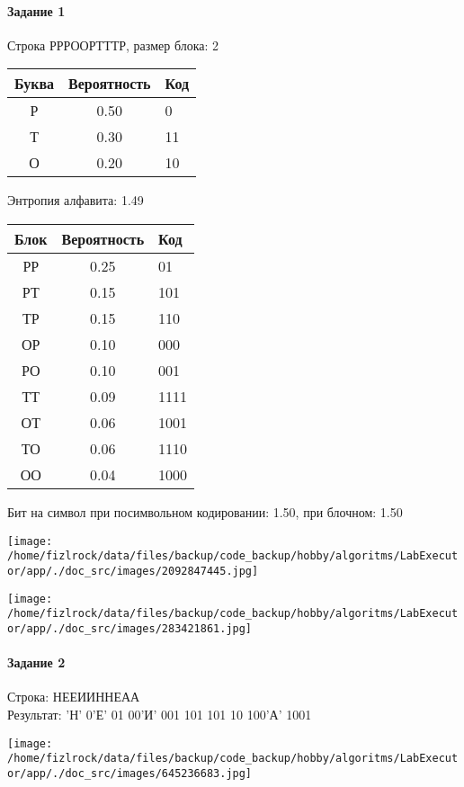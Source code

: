 \documentclass[a4paper, 12pt]{article}
\begin{document}
\paragraph{Задание 1}

Строка РРРООРТТТР, размер блока: 2
\begin{center}
 \begin{tabular}{ |c|c|l| } 
  \hline
     Буква & Вероятность & Код\\ \hline
Р & 0.50 & 0\\\hline
Т & 0.30 & 11\\\hline
О & 0.20 & 10
\\ \hline \end{tabular}
\end{center}
Энтропия алфавита: 1.49
\begin{center}
 \begin{tabular}{ |c|c|l| } 
  \hline
     Блок & Вероятность & Код\\ \hline
РР & 0.25 & 01\\\hline
РТ & 0.15 & 101\\\hline
ТР & 0.15 & 110\\\hline
ОР & 0.10 & 000\\\hline
РО & 0.10 & 001\\\hline
ТТ & 0.09 & 1111\\\hline
ОТ & 0.06 & 1001\\\hline
ТО & 0.06 & 1110\\\hline
ОО & 0.04 & 1000
\\ \hline \end{tabular}
\end{center}
Бит на символ при посимвольном кодировании: 1.50, при блочном: 1.50

\texttt{[image: /home/fizlrock/data/files/backup/code\_backup/hobby/algoritms/LabExecutor/app/./doc\_src/images/2092847445.jpg]}

\texttt{[image: /home/fizlrock/data/files/backup/code\_backup/hobby/algoritms/LabExecutor/app/./doc\_src/images/283421861.jpg]}
\pagebreak
\paragraph{Задание 2}

Строка: 
НЕЕИИННЕАА\\
Результат: 'Н' 0'Е' 01 00'И' 001 101 101 10 100'А' 1001

\texttt{[image: /home/fizlrock/data/files/backup/code\_backup/hobby/algoritms/LabExecutor/app/./doc\_src/images/645236683.jpg]}
\end{document}
